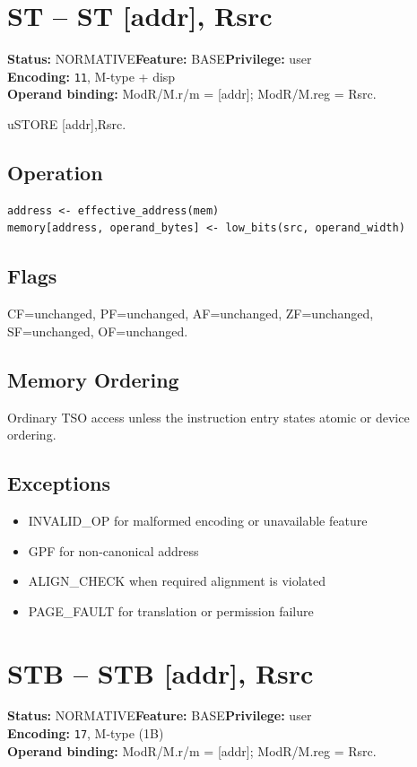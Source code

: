 \documentclass[10pt]{article}
\begin{document}
\section{ST -- ST [addr], Rsrc}
\textbf{Status:} NORMATIVE\quad \textbf{Feature:} BASE\quad \textbf{Privilege:} user\\
\textbf{Encoding:} \texttt{11}, M-type + disp\\
\textbf{Operand binding:} ModR/M.r/m = [addr]; ModR/M.reg = Rsrc.

uSTORE [addr],Rsrc.

\subsection*{Operation}
\begin{lstlisting}
address <- effective_address(mem)
memory[address, operand_bytes] <- low_bits(src, operand_width)
\end{lstlisting}
\subsection*{Flags}
CF=unchanged, PF=unchanged, AF=unchanged, ZF=unchanged, SF=unchanged, OF=unchanged.
\subsection*{Memory Ordering}
Ordinary TSO access unless the instruction entry states atomic or device ordering.
\subsection*{Exceptions}
\begin{itemize}
\item INVALID\_OP for malformed encoding or unavailable feature
\item GPF for non-canonical address
\item ALIGN\_CHECK when required alignment is violated
\item PAGE\_FAULT for translation or permission failure
\end{itemize}
\clearpage

\section{STB -- STB [addr], Rsrc}
\textbf{Status:} NORMATIVE\quad \textbf{Feature:} BASE\quad \textbf{Privilege:} user\\
\textbf{Encoding:} \texttt{17}, M-type (1B)\\
\textbf{Operand binding:} ModR/M.r/m = [addr]; ModR/M.reg = Rsrc.
\end{document}
